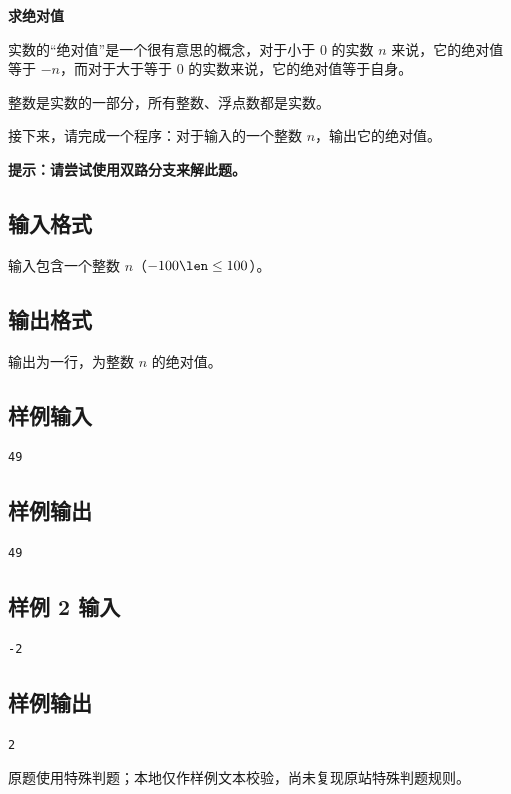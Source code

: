\documentclass{article}
\newcommand{\problemname}[1]{\begin{center}\Large\bfseries #1\end{center}}
\begin{document}
\problemname{求绝对值}

实数的“绝对值”是一个很有意思的概念，对于小于 $0$ 的实数 $n$ 来说，它的绝对值等于 $-n$，而对于大于等于 $0$ 的实数来说，它的绝对值等于自身。

整数是实数的一部分，所有整数、浮点数都是实数。

接下来，请完成一个程序：对于输入的一个整数 $n$，输出它的绝对值。

\textbf{提示：请尝试使用双路分支来解此题。}

\subsection*{输入格式}
输入包含一个整数 $n$（$-100\len\le100$）。

\subsection*{输出格式}
输出为一行，为整数 $n$ 的绝对值。

\subsection*{样例输入}
\begin{verbatim}
49
\end{verbatim}

\subsection*{样例输出}
\begin{verbatim}
49
\end{verbatim}

\subsection*{样例 2 输入}
\begin{verbatim}
-2
\end{verbatim}

\subsection*{样例输出}
\begin{verbatim}
2
\end{verbatim}

原题使用特殊判题；本地仅作样例文本校验，尚未复现原站特殊判题规则。
\end{document}
